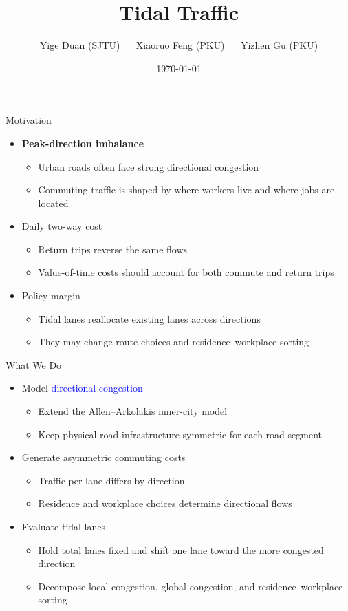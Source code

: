 \documentclass[11pt,aspectratio=169]{beamer}
\title[Tidal Lanes]{Tidal Traffic}
\author[Duan (SJTU), Feng (PKU), Gu (PKU)]{Yige Duan (SJTU) $\quad$ Xiaoruo Feng (PKU) $\quad$ Yizhen Gu (PKU)}
\date{\today}
\begin{document}
\begin{frame}
\titlepage
\end{frame}

\begin{frame}{Motivation}
\begin{itemize}
  \item \textbf{Peak-direction imbalance}
  \begin{itemize}
    \item Urban roads often face strong directional congestion
    \item Commuting traffic is shaped by where workers live and where jobs are located
  \end{itemize}
  \item Daily two-way cost
  \begin{itemize}
    \item Return trips reverse the same flows
    \item Value-of-time costs should account for both commute and return trips
  \end{itemize}
  \item Policy margin
  \begin{itemize}
    \item Tidal lanes reallocate existing lanes across directions
    \item They may change route choices and residence--workplace sorting
  \end{itemize}
\end{itemize}
\end{frame}

\begin{frame}{What We Do}
\begin{itemize}
  \item Model \textcolor{blue}{directional congestion}
  \begin{itemize}
    \item Extend the Allen--Arkolakis inner-city model
    \item Keep physical road infrastructure symmetric for each road segment
  \end{itemize}
  \item Generate asymmetric commuting costs
  \begin{itemize}
    \item Traffic per lane differs by direction
    \item Residence and workplace choices determine directional flows
  \end{itemize}
  \item Evaluate tidal lanes
  \begin{itemize}
    \item Hold total lanes fixed and shift one lane toward the more congested direction
    \item Decompose local congestion, global congestion, and residence--workplace sorting
  \end{itemize}
\end{itemize}
\end{frame}
\end{document}
